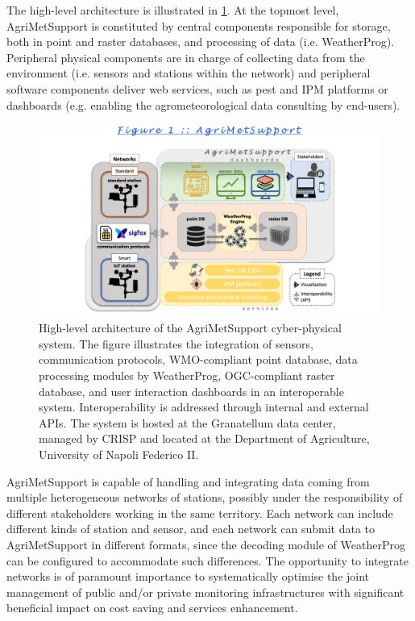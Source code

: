 \documentclass[authoryear,preprint,review,12pt]{elsarticle}
\begin{document}
The high-level architecture is illustrated in \cref{cyberPhysicalSystemFig}.
At the topmost level, AgriMetSupport is constituted by central components responsible for storage, both in point and raster databases, and processing of data (i.e. WeatherProg).
Peripheral physical components are in charge of collecting data from the environment (i.e. sensors and stations within the network) and peripheral software components deliver web services, such as pest and IPM platforms or dashboards (e.g. enabling the agrometeorological data consulting by end-users).
\begin{figure}[!t] %
	\centering %
	\includegraphics[angle=0,scale=.56,trim=4.6cm 0cm 2cm 2.4cm,clip]{Fig01_AgriMetSupport.png}
	\caption{
            High-level architecture of the Agri\-Met\-Support cyber-physical system. The figure illustrates the integration of sensors, communication protocols, WMO-compliant point database, data processing modules by WeatherProg, OGC-compliant raster database, and user interaction dashboards in an interoperable system. Interoperability is addressed through internal and external APIs. The system is hosted at the Granatellum data center, managed by CRISP and located at the Department of Agriculture, University of Napoli Federico II.
 }
	\label{cyberPhysicalSystemFig}
\end{figure}
Agri\-Met\-Support is capable of handling and integrating data coming from multiple heterogeneous networks of stations, possibly under the responsibility of different stakeholders working in the same territory.
Each network can include different kinds of station and sensor, and each network can submit data to AgriMetSupport in different formats, since the decoding module of WeatherProg can be configured to accommodate such differences.
The opportunity to integrate networks is of paramount importance to sys\-tem\-at\-ic\-al\-ly
 optimise the joint management of public and/or private monitoring infrastructures with significant beneficial impact on cost saving and services enhancement.
\end{document}
